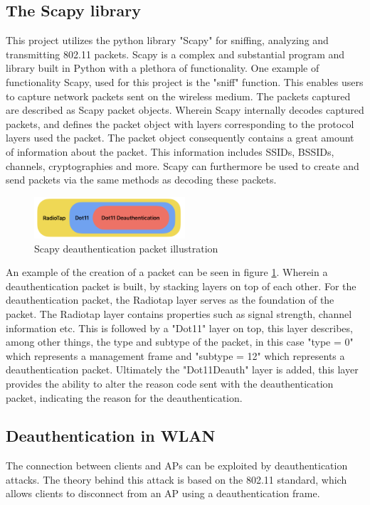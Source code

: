 \subsection{The Scapy library}
This project utilizes the python library "Scapy" for sniffing, analyzing and transmitting 802.11 packets. Scapy is a complex and substantial program and library built in Python with a plethora of functionality. One example of functionality Scapy, used for this project is the "sniff" function. This enables users to capture network packets sent on the wireless medium. 
The packets captured are described as Scapy packet objects. Wherein Scapy internally decodes captured packets, and defines the packet object with layers corresponding to the protocol layers used the packet. The packet object consequently contains a great amount of information about the packet. This information includes SSIDs, BSSIDs, channels, cryptographies and more. 
Scapy can furthermore be used to create and send packets via the same methods as decoding these packets. 

\begin{figure}[!htbp]
    \centering
    \includegraphics[width=0.5\textwidth]{Latex-Files/Billeder/scapy_packet.png}
    \caption{Scapy deauthentication packet illustration}
    \label{scapy_packet}
\end{figure}

An example of the creation of a packet can be seen in figure \ref{scapy_packet}. Wherein a deauthentication packet is built, by stacking layers on top of each other. For the deauthentication packet, the Radiotap layer serves as the foundation of the packet. The Radiotap layer contains properties such as signal strength, channel information etc. This is followed by a "Dot11" layer on top, this layer describes, among other things, the type and subtype of the packet, in this case "type = 0" which represents a management frame and "subtype = 12" which represents a deauthentication packet. Ultimately the "Dot11Deauth" layer is added, this layer provides the ability to alter the reason code sent with the deauthentication packet, indicating the reason for the deauthentication.\cite{Scapy_documentation}


\subsection{Deauthentication in WLAN}
The connection between clients and APs can be exploited by deauthentication attacks. The theory behind this attack is based on the 802.11 standard, which allows clients to disconnect from an AP using a deauthentication frame\cite{IEEE802.11}.

